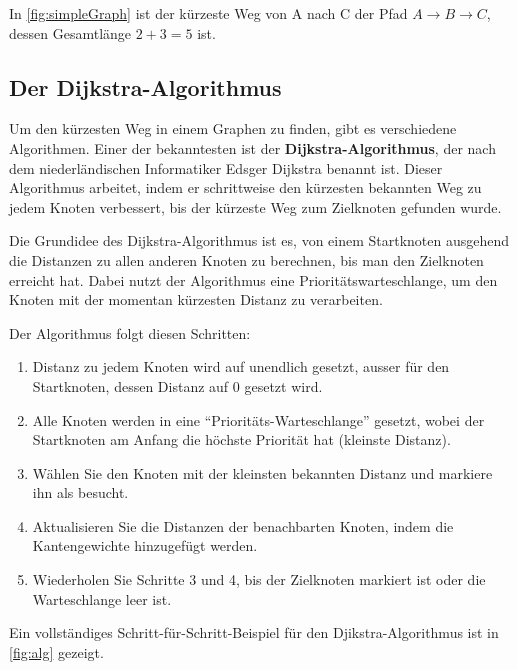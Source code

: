 In \cref{fig:simpleGraph} ist der kürzeste Weg von A nach C der Pfad $A \rightarrow B \rightarrow C$, dessen Gesamtlänge $2 + 3 = 5$ ist.

\subsection{Der Dijkstra-Algorithmus}

Um den kürzesten Weg in einem Graphen zu finden, gibt es verschiedene Algorithmen. Einer der bekanntesten ist der \textbf{Dijkstra-Algorithmus}, der nach dem niederländischen Informatiker Edsger Dijkstra benannt ist. Dieser Algorithmus arbeitet, indem er schrittweise den kürzesten bekannten Weg zu jedem Knoten verbessert, bis der kürzeste Weg zum Zielknoten gefunden wurde.

Die Grundidee des Dijkstra-Algorithmus ist es, von einem Startknoten ausgehend die Distanzen zu allen anderen Knoten zu berechnen, bis man den Zielknoten erreicht hat. Dabei nutzt der Algorithmus eine Prioritätswarteschlange, um den Knoten mit der momentan kürzesten Distanz zu verarbeiten.

Der Algorithmus folgt diesen Schritten:

\begin{enumerate}
    \item Distanz zu jedem Knoten wird auf unendlich gesetzt, ausser für den Startknoten, dessen Distanz auf 0 gesetzt wird.
    \item Alle Knoten werden in eine ``Prioritäts-Warteschlange'' gesetzt, wobei der Startknoten am Anfang die höchste Priorität hat (kleinste Distanz).
    \item Wählen Sie den Knoten mit der kleinsten bekannten Distanz und markiere ihn als besucht.
    \item Aktualisieren Sie die Distanzen der benachbarten Knoten, indem die Kantengewichte hinzugefügt werden.
    \item Wiederholen Sie Schritte 3 und 4, bis der Zielknoten markiert ist oder die Warteschlange leer ist.
\end{enumerate}


Ein vollständiges Schritt-für-Schritt-Beispiel für den Djikstra-Algorithmus ist in \cref{fig:alg} gezeigt.

